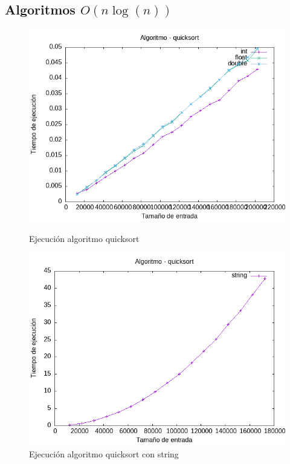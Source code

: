 \documentclass[11pt]{article}
\begin{document}
    \subsection{Algoritmos  \(O(n\log(n))\)}
    \begin{figure}[H]
        \begin{minipage}{0.5\textwidth}
            \centering
            \includegraphics[width=\linewidth]{assets/Img/quicksort.png}
            \caption{Ejecución algoritmo quicksort}
            \label{fig:quicksort}
        \end{minipage}%
        \begin{minipage}{0.5\textwidth}
            \centering
            \includegraphics[width=\linewidth]{assets/Img/quicksortstring.png}
            \caption{Ejecución algoritmo quicksort con string}
            \label{fig:quicksortstring}
        \end{minipage}
    \end{figure}
\end{document}
